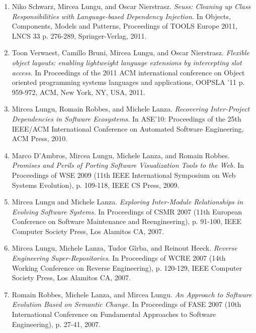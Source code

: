 \begin{enumerate}
\item Niko Schwarz, Mircea Lungu, and Oscar Nierstrasz. \emph{Seuss: Cleaning up Class Responsibilities with Language-based Dependency Injection.} In Objects, Components, Models and Patterns, Proceedings of TOOLS Europe 2011, LNCS 33 p. 276-289, Springer-Verlag, 2011. 

\item Toon Verwaest, Camillo Bruni, Mircea Lungu, and Oscar Nierstrasz. \emph{Flexible object layouts: enabling lightweight language extensions by intercepting slot access.} In Proceedings of the 2011 ACM international conference on Object oriented programming systems languages and applications, OOPSLA '11 p. 959-972, ACM, New York, NY, USA, 2011. 
\item 
Mircea Lungu, Romain Robbes, and Michele Lanza. \emph{Recovering Inter-Project Dependencies in Software Ecosystems.} In ASE'10: Proceedings of the 25th IEEE/ACM International Conference on Automated Software Engineering, ACM Press, 2010. 
\item Marco D'Ambros, Mircea Lungu, Michele Lanza, and Romain Robbes. \emph{Promises and Perils of Porting Software Visualization Tools to the Web.} In Proceedings of WSE 2009 (11th IEEE International Symposium on Web Systems Evolution), p. 109-118, IEEE CS Press, 2009.
\item 
Mircea Lungu and Michele Lanza. \emph{Exploring Inter-Module Relationships in Evolving Software Systems.} In Proceedings of CSMR 2007 (11th European Conference on Software Maintenance and Reengineering), p. 91-100, IEEE Computer Society Press, Los Alamitos CA, 2007.
\item 
Mircea Lungu, Michele Lanza, Tudor G\^irba, and Reinout Heeck. \emph{Reverse Engineering Super-Repositories.} In Proceedings of WCRE 2007 (14th Working Conference on Reverse Engineering), p. 120-129, IEEE Computer Society Press, Los Alamitos CA, 2007. 
\item Romain Robbes, Michele Lanza, and Mircea Lungu. \emph{An Approach to Software Evolution Based on Semantic Change.} In Proceedings of FASE 2007 (10th International Conference on Fundamental Approaches to Software Engineering), p. 27-41, 2007.



\end{enumerate}